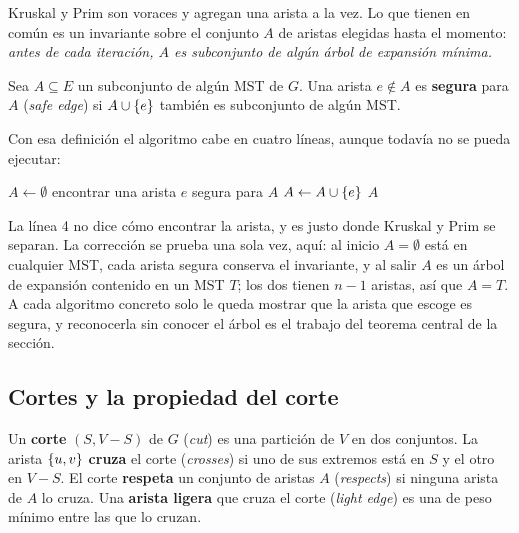 \documentclass[11pt,letterpaper]{article}
\begin{document}
Kruskal y Prim son voraces y agregan una arista a la vez. Lo que
tienen en común es un invariante sobre el conjunto $A$ de aristas
elegidas hasta el momento: \emph{antes de cada iteración, $A$ es
subconjunto de algún árbol de expansión mínima.}

\begin{definicion}
  \label{def:arista-segura-mst}
  Sea $A \subseteq E$ un subconjunto de algún MST de $G$. Una arista
  $e \notin A$ es \textbf{segura} para $A$ (\textit{safe edge}) si
  $A \cup \left\{ e \right\}$ también es subconjunto de algún MST.
\end{definicion}

Con esa definición el algoritmo cabe en cuatro líneas, aunque todavía
no se pueda ejecutar:

\begin{algorithm}[H]
\caption{\textsc{MST-Genérico}$(G, w)$}
\label{alg:mst-generico}
\begin{algorithmic}[1]
  \State $A \gets \emptyset$
    \State encontrar una arista $e$ segura para $A$
    \State $A \gets A \cup \left\{ e \right\}$
  \EndWhile
  \State \Return $A$
\EndProcedure
\end{algorithmic}
\end{algorithm}

La línea 4 no dice cómo encontrar la arista, y es justo donde Kruskal
y Prim se separan. La corrección se prueba una sola vez, aquí: al
inicio $A = \emptyset$ está en cualquier MST, cada arista segura
conserva el invariante, y al salir $A$ es un árbol de expansión
contenido en un MST $T$; los dos tienen $n - 1$ aristas, así que
$A = T$. A cada algoritmo concreto solo le queda mostrar que la arista
que escoge es segura, y reconocerla sin conocer el árbol es el trabajo
del teorema central de la sección.


\subsection*{Cortes y la propiedad del corte}

\begin{definicion}
  \label{def:corte-mst}
  Un \textbf{corte} $(S, V - S)$ de $G$ (\textit{cut}) es una partición
  de $V$ en dos conjuntos. La arista $\left\{ u, v \right\}$ \textbf{cruza} el
  corte (\textit{crosses}) si uno de sus extremos está en $S$ y el otro
  en $V - S$. El corte \textbf{respeta} un conjunto de aristas $A$
  (\textit{respects}) si ninguna arista de $A$ lo cruza. Una
  \textbf{arista ligera} que cruza el corte (\textit{light edge}) es
  una de peso mínimo entre las que lo cruzan.
\end{definicion}
\end{document}
